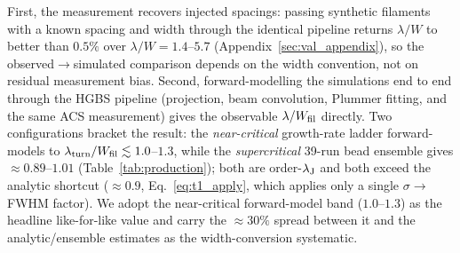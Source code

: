 \documentclass[usenatbib,twoside,twocolumn]{mnras}
\begin{document}
First, the measurement recovers injected spacings: passing synthetic filaments with a known spacing and width through the identical pipeline returns $\lambda/W$ to better than $0.5\%$ over $\lambda/W=1.4$--$5.7$ (Appendix~\ref{sec:val_appendix}), so the observed$\to$simulated comparison depends on the width convention, not on residual measurement bias. Second, forward-modelling the simulations end to end through the HGBS pipeline (projection, beam convolution, Plummer fitting, and the same ACS measurement) gives the observable $\lambda/W_{\rm fil}$ directly. Two configurations bracket the result: the \emph{near-critical} growth-rate ladder forward-models to $\lambda_{\rm turn}/W_{\rm fil}\lesssim1.0$--$1.3$, while the \emph{supercritical} 39-run bead ensemble gives $\approx0.89$--$1.01$ (Table~\ref{tab:production}); both are order-$\lambda_{\rm J}$ and both exceed the analytic shortcut ($\approx0.9$, Eq.~\ref{eq:t1_apply}, which applies only a single $\sigma\!\to\!$FWHM factor). We adopt the near-critical forward-model band ($1.0$--$1.3$) as the headline like-for-like value and carry the $\approx30\%$ spread between it and the analytic/ensemble estimates as the width-conversion systematic.
\end{document}
